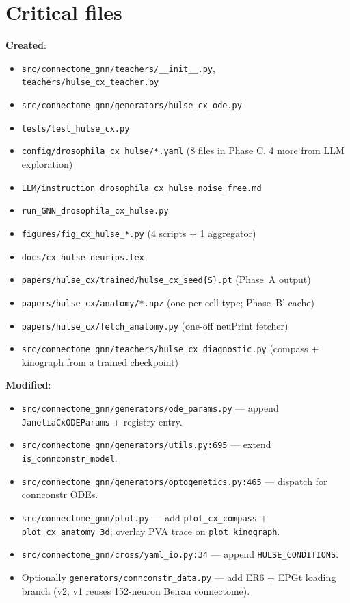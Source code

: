 \documentclass[11pt]{article}
\begin{document}
\section{Critical files}

\textbf{Created}:
\begin{itemize}[leftmargin=*, itemsep=0pt]
\item \texttt{src/connectome\_gnn/teachers/\_\_init\_\_.py}, \texttt{teachers/hulse\_cx\_teacher.py}
\item \texttt{src/connectome\_gnn/generators/hulse\_cx\_ode.py}
\item \texttt{tests/test\_hulse\_cx.py}
\item \texttt{config/drosophila\_cx\_hulse/*.yaml} (8 files in Phase C, 4 more from LLM exploration)
\item \texttt{LLM/instruction\_drosophila\_cx\_hulse\_noise\_free.md}
\item \texttt{run\_GNN\_drosophila\_cx\_hulse.py}
\item \texttt{figures/fig\_cx\_hulse\_*.py} (4 scripts + 1 aggregator)
\item \texttt{docs/cx\_hulse\_neurips.tex}
\item \texttt{papers/hulse\_cx/trained/hulse\_cx\_seed\{S\}.pt} (Phase~A output)
\item \texttt{papers/hulse\_cx/anatomy/*.npz} (one per cell type; Phase~B' cache)
\item \texttt{papers/hulse\_cx/fetch\_anatomy.py} (one-off neuPrint fetcher)
\item \texttt{src/connectome\_gnn/teachers/hulse\_cx\_diagnostic.py} (compass + kinograph from a trained checkpoint)
\end{itemize}

\textbf{Modified}:
\begin{itemize}[leftmargin=*, itemsep=0pt]
\item \texttt{src/connectome\_gnn/generators/ode\_params.py} ---
  append \texttt{JaneliaCxODEParams} + registry entry.
\item \texttt{src/connectome\_gnn/generators/utils.py:695} ---
  extend \texttt{is\_connconstr\_model}.
\item \texttt{src/connectome\_gnn/generators/optogenetics.py:465} ---
  dispatch for connconstr ODEs.
\item \texttt{src/connectome\_gnn/plot.py} ---
  add \texttt{plot\_cx\_compass} + \texttt{plot\_cx\_anatomy\_3d};
  overlay PVA trace on \texttt{plot\_kinograph}.
\item \texttt{src/connectome\_gnn/cross/yaml\_io.py:34} ---
  append \texttt{HULSE\_CONDITIONS}.
\item Optionally \texttt{generators/connconstr\_data.py} --- add ER6 +
  EPGt loading branch (v2; v1 reuses 152-neuron Beiran connectome).
\end{itemize}
\end{document}
